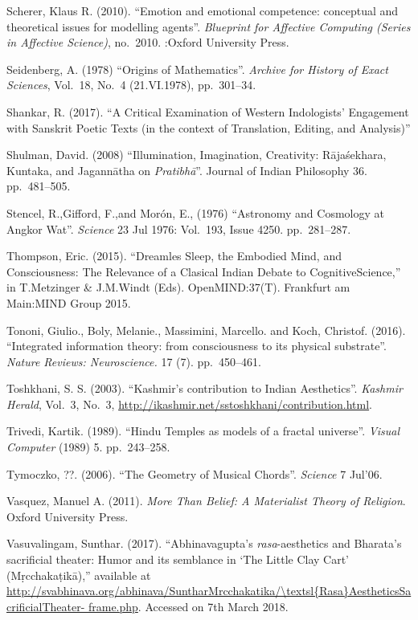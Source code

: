 \begin{thebibliography}{99}
Scherer, Klaus R. (2010). “Emotion and emotional competence: conceptual and theoretical issues for modelling agents”. \textsl{Blueprint for Affective Computing (Series in Affective Science)}, no.~2010. :Oxford University Press.

Seidenberg, A. (1978) “Origins of Mathematics”. \textsl{Archive for History of Exact Sciences}, Vol.~18, No.~4 (21.VI.1978), pp.~301--34.

Shankar, R. (2017). “A Critical Examination of Western Indologists’ Engagement with Sanskrit Poetic Texts (in the context of Translation, Editing, and Analysis)”

Shulman, David. (2008) “Illumination, Imagination, Creativity: Rājaśekhara, Kuntaka, and Jagannātha on \textsl{Pratibhā}”. Journal of Indian Philosophy 36. pp.~481--505.

Stencel, R.,Gifford, F.,and Morón, E., (1976) “Astronomy and Cosmology at Angkor Wat”. \textsl{Science} 23 Jul 1976: Vol.~193, Issue 4250. pp.~281--287.

Thompson, Eric. (2015). “Dreamles Sleep, the Embodied Mind, and Consciousness: The Relevance of a Clasical Indian Debate to CognitiveScience,” in T.Metzinger \& J.M.Windt (Eds). OpenMIND:37(T). Frankfurt am Main:MIND Group 2015.

Tononi, Giulio., Boly, Melanie., Massimini, Marcello. and Koch, Christof. (2016). “Integrated information theory: from consciousness to its physical substrate”. \textsl{Nature Reviews: Neuroscience.} 17 (7). pp.~450--461.

Toshkhani, S. S. (2003). “Kashmir’s contribution to Indian Aesthetics”. \textsl{Kashmir Herald}, Vol.~3, No.~3, \url{http://ikashmir.net/sstoshkhani/contribution.html}.

Trivedi, Kartik. (1989). “Hindu Temples as models of a fractal universe”. \textsl{Visual Computer} (1989) 5. pp.~243--258.

Tymoczko, ??. (2006). “The Geometry of Musical Chords”. \textsl{Science} 7 Jul’06.

Vasquez, Manuel A. (2011). \textsl{More Than Belief: A Materialist Theory of Religion}. Oxford University Press.

Vasuvalingam, Sunthar. (2017). “Abhinavagupta’s \textsl{rasa}-aesthetics and Bharata’s sacrificial theater: Humor and its semblance in ‘The Little Clay Cart’ (Mṛcchakaṭikā),” available at \url{http://svabhinava.org/abhinava/SuntharMrcchakatika/\textsl{Rasa}AestheticsSacrificialTheater- frame.php}. Accessed on 7th March 2018.


\end{thebibliography}
